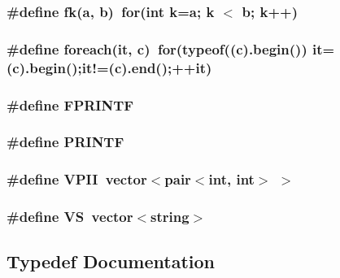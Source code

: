\subsubsection{\setlength{\rightskip}{0pt plus 5cm}\#define fk(a, b)~for(int k=a; k $<$ b; k++)}\label{main_8h_7473ac2a083bbb8bd65a2a35e804a8ad}


\subsubsection{\setlength{\rightskip}{0pt plus 5cm}\#define foreach(it, c)~for(typeof((c).begin()) it=(c).begin();it!=(c).end();++it)}\label{main_8h_35602f6dd088ffe8623bee13c68f7ab3}


\subsubsection{\setlength{\rightskip}{0pt plus 5cm}\#define FPRINTF}\label{main_8h_235c4f0261f1ed6dea10b6230e46389f}


\subsubsection{\setlength{\rightskip}{0pt plus 5cm}\#define PRINTF}\label{main_8h_565ae697babd4d63f857d81fdd498237}


\subsubsection{\setlength{\rightskip}{0pt plus 5cm}\#define VPII~vector$<$pair$<$int, int$>$ $>$}\label{main_8h_ebd5a596d5f39923524a1cf2ef0546fa}


\subsubsection{\setlength{\rightskip}{0pt plus 5cm}\#define VS~vector$<$string$>$}\label{main_8h_525227c8280d4a295cbe86d83d7a7e68}




\subsection{Typedef Documentation}

